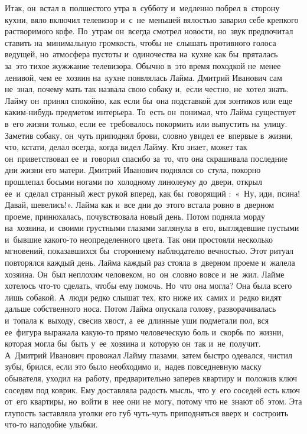 Итак, он~встал в~полшестого утра в~субботу и~медленно побрел в~сторону кухни, вяло включил телевизор и~с~не~меньшей вялостью заварил себе крепкого растворимого кофе.
По~утрам он~всегда смотрел новости, но~звук предпочитал ставить на~минимальную громкость, чтобы не~слышать противного голоса ведущей, но~атмосфера пустоты и~одиночества на~кухне как бы~пряталась за~это тихое жужжание телевизора.
Обычно в~это время походкой не~менее ленивой, чем ее~хозяин на~кухне появлялась Лайма.
Дмитрий Иванович сам не~знал, почему мать так назвала свою собаку и,~если честно, не~хотел знать.
Лайму он~принял спокойно, как если бы~она подставкой для зонтиков или еще каким-нибудь предметом интерьера.
То~есть он~понимал, что Лайма существует в~его жизни только, если ее~требовалось покормить или выпустить на~улицу.
Заметив собаку, он~чуть приподнял брови, словно увидел ее~впервые в~жизни, что, кстати, делал всегда, когда видел Лайму.
Кто знает, может так он~приветствовал ее~и~говорил спасибо за~то, что она скрашивала последние дни жизни его матери.
Дмитрий Иванович поднялся со~стула, покорно прошлепал босыми ногами по~холодному линолеуму до~двери, открыл ее~и~сделал странный жест рукой вперед, как бы~говорящий :~«~Ну, иди, псина! Давай, шевелись!».
Лайма как и~все дни до~этого встала ровно в~дверном проеме, принюхалась, почувствовала новый день.
Потом подняла морду на~хозяина, и~своими грустными глазами заглянула в~его, выглядевшие пустыми и~бывшие какого-то неопределенного цвета.
Так они простояли несколько мгновений, показавшихся бы~стороннему наблюдателю вечностью.
Этот ритуал повторялся каждый день.
Лайма каждый раз стояла в~дверном проеме и~жалела хозяина.
Он~был неплохим человеком, но~он~словно вовсе и~не~жил.
Лайме хотелось что-то сделать, чтобы ему помочь.
Но~что она могла? Она была всего лишь собакой.
А~люди редко слышат тех, кто ниже их~самих и~редко видят дальше собственного носа.
Потом Лайма опускала голову, разворачивалась и~топала к~выходу, свесив хвост, а~ее~длинные уши подметали пол, вся ее~фигура выражала какую-то прямо человеческую боль и~скорбь по~жизни, которая могла бы~быть у~ее~хозяина и~которую он~так и~не~получит.
А~Дмитрий Иванович провожал Лайму глазами, затем быстро одевался, чистил зубы, брился, если это было необходимо и,~надев повседневную маску обывателя, уходил на~работу, предварительно заперев квартиру и~положив ключ соседям под коврик.
Ему доставляла радость мысль, что у~его соседей есть ключ от~его квартиры, но~войти в~нее они не~могу, потому что не~знают об~этом.
Эта глупость заставляла уголки его губ чуть-чуть приподняться вверх и~состроить что-то наподобие улыбки.
 
